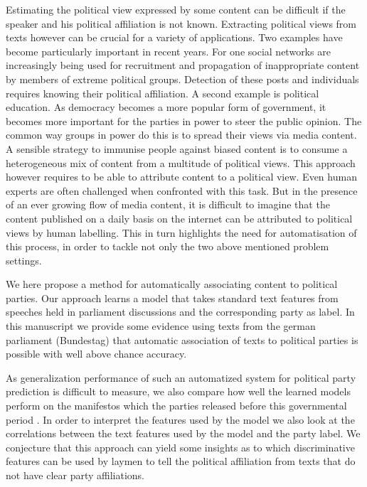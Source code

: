 \documentclass{article} %
\begin{document}
Estimating the political view expressed by some content can be difficult if the speaker and his political affiliation is not known. Extracting political views from texts however can be crucial for a variety of applications. Two examples have become particularly important in recent years. For one social networks are increasingly being used for recruitment and propagation of inappropriate content by members of extreme political groups. Detection of these posts and individuals requires knowing their political affiliation. A second example is political education. As democracy becomes a more popular form of government, it becomes more important for the parties in power to steer the public opinion. The common way groups in power do this is to spread their views via media content. A sensible strategy to immunise people against biased content is to consume a heterogeneous mix of content from a multitude of political views. This approach however requires to be able to attribute content to a political view. 
Even human experts are often challenged when confronted with this task. But in the presence of an ever growing flow of media content, it is difficult to imagine that the content published on a daily basis on the internet can be attributed to political views by human labelling. This in turn highlights the need for automatisation of this process, in order to tackle not only the two above mentioned problem settings.

We here propose a method for automatically associating content to political parties. Our approach learns a model that takes standard text features from speeches held in parliament discussions and the corresponding party as label. In this manuscript we provide some evidence using texts from the german parliament (Bundestag) \cite{plenarprotokolle} that automatic association of texts to political parties is possible with well above chance accuracy. 

As generalization performance of such an automatized system for political party prediction is difficult to measure, we also compare how well the learned models perform on the manifestos which the parties released before this governmental period \cite{linke_parteiprogramm, gruene_parteiprogramm,spd_parteiprogramm, cdu_parteiprogramm}. In order to interpret the features used by the model we also look at the correlations between the text features used by the model and the party label. We conjecture that this approach can yield some insights as to which discriminative features can be used by laymen to tell the political affiliation from texts that do not have clear party affiliations. 
\end{document}
